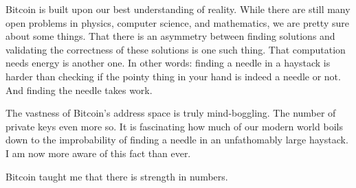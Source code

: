 Bitcoin is built upon our best understanding of reality. While there are
still many open problems in physics, computer science, and mathematics,
we are pretty sure about some things. That there is an asymmetry between
finding solutions and validating the correctness of these solutions is
one such thing. That computation needs energy is another one. In other
words: finding a needle in a haystack is harder than checking if the
pointy thing in your hand is indeed a needle or not. And finding the
needle takes work.

The vastness of Bitcoin's address space is truly mind-boggling. The
number of private keys even more so. It is fascinating how much of our
modern world boils down to the improbability of finding a needle in an
unfathomably large haystack. I am now more aware of this fact than ever.

Bitcoin taught me that there is strength in numbers.

%
%
%
%

